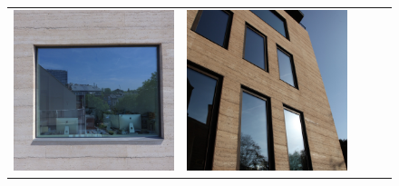 \begin{figure}[H]
{\begin{tabular}{@{}ccccc@{}}
      \includegraphics[width=\linewidth]{Images/LoRAs/STAMPBETON/Training_images/8.jpg} &
      \includegraphics[width=\linewidth]{Images/LoRAs/STAMPBETON/Training_images/9.jpg} &

\end{tabular}}
\end{figure}
